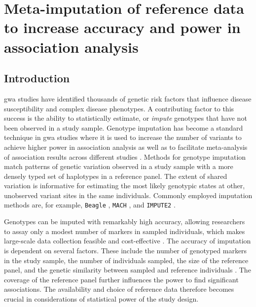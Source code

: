 
\glsresetall




{
\singlespacing
\chapter{Meta-imputation of reference data to increase accuracy and power in association analysis}
\label{ch:metaimpute}
\minitoc
}


%
\section{Introduction}
%


\Gls{gwa} studies have identified thousands of genetic risk factors that influence disease susceptibility and complex disease phenotypes.
A contributing factor to this success is the ability to statistically estimate, or \emph{impute} genotypes that have not been observed in a study sample.
Genotype imputation has become a standard technique in \gls{gwa} studies where it is used to increase the number of variants to achieve higher power in association analysis as well as to facilitate meta-analysis of association results across different studies \citep{Marchini:2007bg, Marchini:2010cga}.
Methods for genotype imputation match patterns of genetic variation observed in a study sample with a more densely typed set of haplotypes in a reference panel.
The extent of shared variation is informative for estimating the most likely genotypic states at other, unobserved variant sites in the same individuals.
Commonly employed imputation methods are, for example, \texttt{Beagle} \citep{Browning:2016iy}, \texttt{MACH} \citep{Li:2010kx}, and \texttt{IMPUTE2} \citep{Howie:2009hq,Howie:2011ia}.

Genotypes can be imputed with remarkably high accuracy, allowing researchers to assay only a modest number of markers in sampled individuals, which makes large-scale data collection feasible and cost-effective \citep{Li:2009kfa}.
The accuracy of imputation is dependent on several factors.
These include the number of genotyped markers in the study sample, the number of individuals sampled, the size of the reference panel, and the genetic similarity between sampled and reference individuals \citep{Howie:2009hq, Roshyara:2015gi}.
The coverage of the reference panel further influences the power to find significant associations.
The availability and choice of reference data therefore becomes crucial in considerations of statistical power of the study design.

